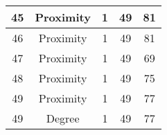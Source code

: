 \documentclass[results.tex]{subfiles}
\begin{document}
\begin{center}
\begin{tabular}{| c || c | c | c | c |}
            \hline
            45                      & Proximity                    & 1                      & 49                      & 81                   \\
            \hline
            46                      & Proximity                    & 1                      & 49                      & 81                   \\
            \hline
            47                      & Proximity                    & 1                      & 49                      & 69                   \\
            \hline
            48                      & Proximity                    & 1                      & 49                      & 75                   \\
            \hline
            49                      & Proximity                    & 1                      & 49                      & 77                   \\
            \hline
            49                      & Degree                       & 1                      & 49                      & 77                   \\
            \hline
        \end{tabular}
    \end{center}
\end{document}
